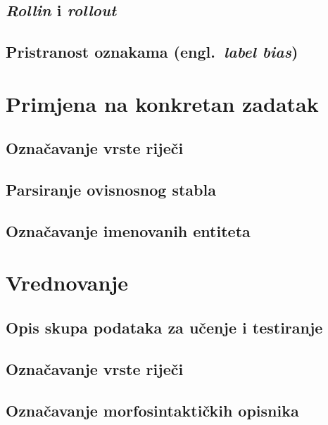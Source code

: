 \documentclass[times, utf8, diplomski]{fer}
\begin{document}
\section{\emph{Rollin} i \emph{rollout}}
\section{Pristranost oznakama (engl.~\emph{label bias})}


\chapter{Primjena na konkretan zadatak}

\section{Označavanje vrste riječi}

\section{Parsiranje ovisnosnog stabla}


\section{Označavanje imenovanih entiteta}

\chapter{Vrednovanje}

\section{Opis skupa podataka za učenje i testiranje}


\section{Označavanje vrste riječi}

\section{Označavanje morfosintaktičkih opisnika}
\end{document}
